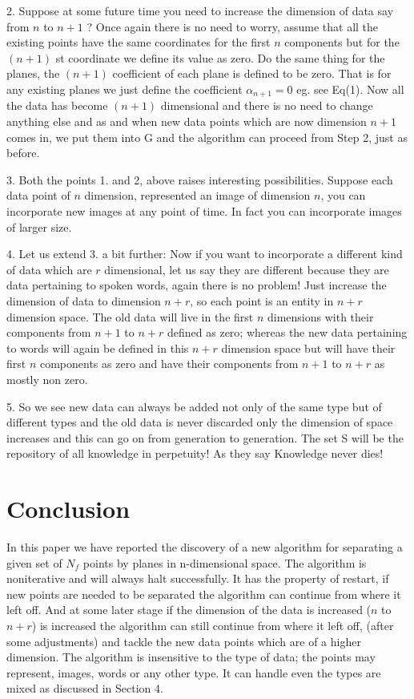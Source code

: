 \documentclass[english]{article}
\begin{document}
2. Suppose at some future time you need to increase the dimension
of data say from $n$ to $n+1$ ? Once again there is no need to worry,
assume that all the existing points have the same coordinates for
the first $n$ components but for the $(n+1)$ st coordinate we define
its value as zero. Do the same thing for the planes, the $(n+1)$
coefficient of each plane is defined to be zero. That is for any existing
planes we just define the coefficient $\alpha_{n+1}=0$ eg. see Eq(1).
Now all the data has become $(n+1)$ dimensional and there is no need
to change anything else and as and when new data points which are
now dimension $n+1$ comes in, we put them into G and the algorithm
can proceed from Step 2, just as before.

3. Both the points 1. and 2, above raises interesting possibilities.
Suppose each data point of $n$ dimension, represented an image of
dimension $n$, you can incorporate new images at any point of time.
In fact you can incorporate images of larger size.

4. Let us extend 3. a bit further: Now if you want to incorporate
a different kind of data which are $r$ dimensional, let us say they
are different because they are data pertaining to spoken words, again
there is no problem! Just increase the dimension of data to dimension
$n+r$, so each point is an entity in $n+r$ dimension space. The
old data will live in the first $n$ dimensions with their components
from $n+1$ to $n+r$ defined as zero; whereas the new data pertaining
to words will again be defined in this $n+r$ dimension space but
will have their first $n$ components as zero and have their components
from $n+1$ to $n+r$ as mostly non zero.

5. So we see new data can always be added not only of the same type
but of different types and the old data is never discarded only the
dimension of space increases and this can go on from generation to
generation. The set S will be the repository of all knowledge in perpetuity!
As they say Knowledge never dies!


\section{Conclusion}

In this paper we have reported the discovery of a new algorithm for
separating a given set of $N_{f}$ points by planes in n-dimensional
space. The algorithm is noniterative and will always halt successfully.
It has the property of restart, if new points are needed to be separated
the algorithm can continue from where it left off. And at some later
stage if the dimension of the data is increased ($n$ to $n+r$) is
increased the algorithm can still continue from where it left off,
(after some adjustments) and tackle the new data points which are
of a higher dimension. The algorithm is insensitive to the type of
data; the points may represent, images, words or any other type. It
can handle even the types are mixed as discussed in Section 4.
\end{document}
